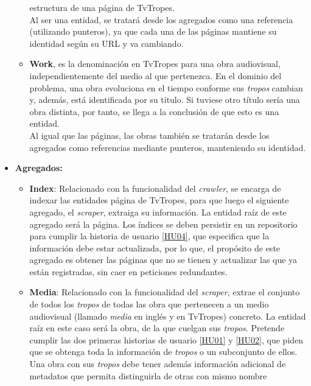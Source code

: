 \begin{itemize}
\begin{itemize}
    estructura de una página de TvTropes.\\
    Al ser una entidad, se tratará desde los agregados como una referencia
    (utilizando punteros), ya que cada una de las páginas mantiene su identidad
    según su URL y va cambiando.
    \item
    \textbf{Work}, es la denominación en TvTropes para una obra audiovisual,
    independientemente del medio al que pertenezca. En el dominio del problema,
    una obra evoluciona en el tiempo conforme sus \textit{tropos} cambian y,
    además, está identificada por su título. Si tuviese otro título sería una
    obra distinta, por tanto, se llega a la conclusión de que esto es una
    entidad.\\
    Al igual que las páginas, las obras también se tratarán desde los agregados
    como referencias mediante punteros, manteniendo su identidad.
  \end{itemize}
  \item \textbf{Agregados:}
  \begin{itemize}
    \item
    \textbf{Index}: Relacionado con la funcionalidad del \textit{crawler}, se
    encarga de indexar las entidades página de TvTropes, para que luego el
    siguiente agregado, el \textit{scraper}, extraiga su información. La entidad
    raíz de este agregado será la página. Los índices se deben persistir en un
    repositorio para cumplir la historia de usuario
    \href{https://github.com/jlgallego99/TropesToGo/issues/9}{[HU04]}, que
    especifica que la información debe estar actualizada, por lo que, el
    propósito de este agregado es obtener las páginas que no se tienen y
    actualizar las que ya están registradas, sin caer en peticiones redundantes.
    \item
    \textbf{Media}: Relacionado con la funcionalidad del \textit{scraper},
    extrae el conjunto de todos los \textit{tropos} de todas las obra que
    pertenecen a un medio audiovisual (llamado \textit{media} en inglés y en
    TvTropes) concreto. La entidad raíz en este caso será la obra, de la que
    cuelgan sus \textit{tropos}. Pretende cumplir las dos primeras historias de
    usuario \href{https://github.com/jlgallego99/TropesToGo/issues/6}{[HU01]} y
    \href{https://github.com/jlgallego99/TropesToGo/issues/7}{[HU02]}, que piden
    que se obtenga toda la información de \textit{tropos} o un subconjunto de
    ellos. Una obra con sus \textit{tropos} debe tener además información
    adicional de metadatos que permita distinguirla de otras con mismo nombre

\end{itemize}
\end{itemize}
